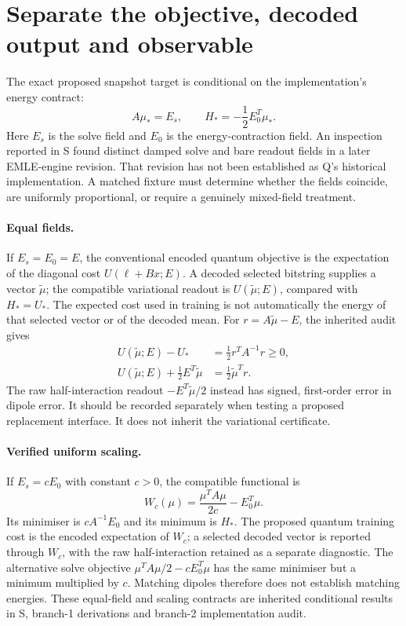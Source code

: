 \documentclass{article}
\begin{document}
\section{Separate the objective, decoded output and observable}

The exact proposed snapshot target is conditional on the implementation's energy contract:
\begin{equation}
A\mu_*=E_s,\qquad H_*=-\frac12E_0^T\mu_*.
\end{equation}
Here $E_s$ is the solve field and $E_0$ is the energy-contraction field. An inspection reported in S found distinct damped solve and bare readout fields in a later EMLE-engine revision. That revision has not been established as Q's historical implementation. A matched fixture must determine whether the fields coincide, are uniformly proportional, or require a genuinely mixed-field treatment.

\paragraph{Equal fields.}
If $E_s=E_0=E$, the conventional encoded quantum objective is the expectation of the diagonal cost $U(\ell+Bx;E)$. A decoded selected bitstring supplies a vector $\tilde\mu$; the compatible variational readout is $U(\tilde\mu;E)$, compared with $H_*=U_*$. The expected cost used in training is not automatically the energy of that selected vector or of the decoded mean. For $r=A\tilde\mu-E$, the inherited audit gives
\begin{align}
U(\tilde\mu;E)-U_*&=\frac12r^TA^{-1}r\geq0,\\
U(\tilde\mu;E)+\frac12E^T\tilde\mu&=\frac12\tilde\mu^Tr.
\end{align}
The raw half-interaction readout $-E^T\tilde\mu/2$ instead has signed, first-order error in dipole error. It should be recorded separately when testing a proposed replacement interface. It does not inherit the variational certificate.

\paragraph{Verified uniform scaling.}
If $E_s=cE_0$ with constant $c>0$, the compatible functional is
\begin{equation}
W_c(\mu)=\frac{\mu^TA\mu}{2c}-E_0^T\mu.
\end{equation}
Its minimiser is $cA^{-1}E_0$ and its minimum is $H_*$. The proposed quantum training cost is the encoded expectation of $W_c$; a selected decoded vector is reported through $W_c$, with the raw half-interaction retained as a separate diagnostic. The alternative solve objective $\mu^TA\mu/2-cE_0^T\mu$ has the same minimiser but a minimum multiplied by $c$. Matching dipoles therefore does not establish matching energies. These equal-field and scaling contracts are inherited conditional results in S, branch-1 derivations and branch-2 implementation audit.
\end{document}
